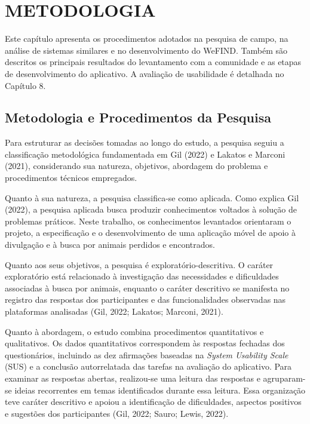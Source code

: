 \section{METODOLOGIA}

Este capítulo apresenta os procedimentos adotados na pesquisa de campo, na análise de sistemas similares e no desenvolvimento do WeFIND. Também são descritos os principais resultados do levantamento com a comunidade e as etapas de desenvolvimento do aplicativo. A avaliação de usabilidade é detalhada no Capítulo 8.

\subsection{Metodologia e Procedimentos da Pesquisa}

Para estruturar as decisões tomadas ao longo do estudo, a pesquisa seguiu a classificação metodológica fundamentada em Gil (2022) e Lakatos e Marconi (2021), considerando sua natureza, objetivos, abordagem do problema e procedimentos técnicos empregados.

Quanto à sua natureza, a pesquisa classifica-se como aplicada. Como explica Gil (2022), a pesquisa aplicada busca produzir conhecimentos voltados à solução de problemas práticos. Neste trabalho, os conhecimentos levantados orientaram o projeto, a especificação e o desenvolvimento de uma aplicação móvel de apoio à divulgação e à busca por animais perdidos e encontrados.

Quanto aos seus objetivos, a pesquisa é exploratório-descritiva. O caráter exploratório está relacionado à investigação das necessidades e dificuldades associadas à busca por animais, enquanto o caráter descritivo se manifesta no registro das respostas dos participantes e das funcionalidades observadas nas plataformas analisadas (Gil, 2022; Lakatos; Marconi, 2021).

Quanto à abordagem, o estudo combina procedimentos quantitativos e qualitativos. Os dados quantitativos correspondem às respostas fechadas dos questionários, incluindo as dez afirmações baseadas na \textit{System Usability Scale} (SUS) e a conclusão autorrelatada das tarefas na avaliação do aplicativo. Para examinar as respostas abertas, realizou-se uma leitura das respostas e agruparam-se ideias recorrentes em temas identificados durante essa leitura. Essa organização teve caráter descritivo e apoiou a identificação de dificuldades, aspectos positivos e sugestões dos participantes (Gil, 2022; Sauro; Lewis, 2022).

